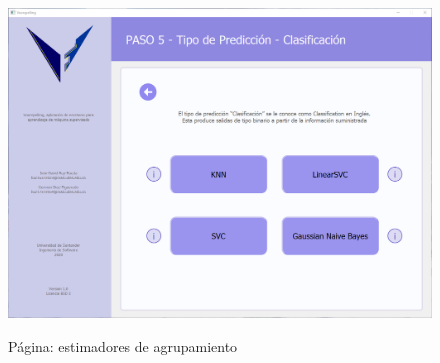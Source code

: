 \begin{figure}[H]
    \centering
    \caption{Página: estimadores de agrupamiento}
    \includegraphics[width=\textwidth]{images/classificationestimator.png}
    \label{fig:clusterestimators}
\end{figure}


